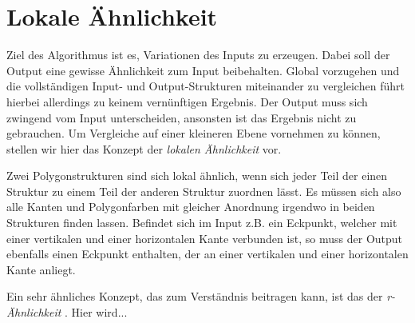 \section{Lokale Ähnlichkeit}
Ziel des Algorithmus ist es, Variationen des Inputs zu erzeugen. Dabei soll der Output eine gewisse Ähnlichkeit zum Input beibehalten. Global
vorzugehen und die vollständigen Input- und Output-Strukturen miteinander zu vergleichen führt hierbei allerdings zu keinem vernünftigen
Ergebnis. Der Output muss sich zwingend vom Input unterscheiden, ansonsten ist das Ergebnis nicht zu gebrauchen. Um Vergleiche auf einer kleineren
Ebene vornehmen zu können, stellen wir hier das Konzept der \textit{lokalen Ähnlichkeit} vor.

Zwei Polygonstrukturen sind sich lokal ähnlich, wenn sich jeder Teil der einen Struktur zu einem Teil der anderen Struktur zuordnen lässt. Es
müssen sich also alle Kanten und Polygonfarben mit gleicher Anordnung irgendwo in beiden Strukturen finden lassen. Befindet sich im Input z.B.
ein Eckpunkt, welcher mit einer vertikalen und einer horizontalen Kante verbunden ist, so muss der Output ebenfalls einen Eckpunkt enthalten,
der an einer vertikalen und einer horizontalen Kante anliegt.


Ein sehr ähnliches Konzept, das zum Verständnis beitragen kann, ist das der \textit{r-Ähnlichkeit} \cite{3_bokeloh_et_al}. Hier wird...